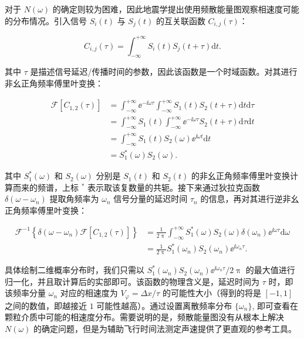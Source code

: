 对于 $N(\omega)$ 的确定则较为困难，因此地震学提出使用频散能量图观察相速度可能的分布情况。引入信号 $S_{i}(t)$ 与 $S_{j}(t)$ 的互关联函数 $C_{i,j}(\tau)$：

\begin{equation}
  C_{i,j}(\tau) = \int_{-\infty}^{+\infty}S_{i}(t)S_{j}(t+\tau)\mathrm{d}t.
\end{equation}

其中 $\tau$ 是描述信号延迟/传播时间的参数，因此该函数是一个时域函数。对其进行非幺正角频率傅里叶变换：

\begin{align}
  \mathcal{F}[C_{1,2}(\tau)] &= \int_{-\infty}^{+\infty}{\ee}^{-\ii\omega\tau}\int_{-\infty}^{+\infty}S_{1}(t)S_{2}(t+\tau)\mathrm{d}t\mathrm{d}\tau \nonumber \\
  &= \int_{-\infty}^{+\infty}S_{1}(t)\int_{-\infty}^{+\infty}{\ee}^{-\ii\omega\tau}S_{2}(t+\tau)\mathrm{d}\tau\mathrm{d}t \nonumber \\
  &= \int_{-\infty}^{+\infty}S_{1}(t)S_{2}(\omega){\ee}^{\ii\omega t}\mathrm{d}t \nonumber \\
  &= S_{1}^{*}(\omega)S_{2}(\omega).
\end{align}

其中 $S_{1}^{*}(\omega)$ 和 $S_{2}(\omega)$ 分别是 $S_{1}(t)$ 和 $S_{2}(t)$ 的非幺正角频率傅里叶变换计算而来的频谱，上标 $^{*}$ 表示取该复数量的共轭。接下来通过狄拉克函数 $\delta(\omega-\omega_{n})$ 提取角频率为 $\omega_{n}$ 信号分量的延迟时间 $\tau_{n}$ 的信息，再对其进行逆非幺正角频率傅里叶变换：

\begin{align}
  \mathcal{F}^{-1}\left\{\delta(\omega-\omega_{n})\mathcal{F}[C_{1,2}(\tau)]\right\} &= \frac{1}{2\uppi}\int_{-\infty}^{+\infty}S_{1}^{*}(\omega)S_{2}(\omega)\delta(\omega_{n}){\ee}^{\ii\omega\tau}\mathrm{d}\omega \nonumber \\
  &= \frac{1}{2\uppi}S_{1}^{*}(\omega_{n})S_{2}(\omega_{n}){\ee}^{\ii\omega_{n}\tau}.
\end{align}

具体绘制二维概率分布时，我们只需以 $S_{1}^{*}(\omega_{n})S_{2}(\omega_{n}){\ee}^{\ii\omega_{n}\tau}/2\uppi$ 的最大值进行归一化，并且取计算后的实部即可。该函数的物理含义是，延迟时间为 $\tau$ 时，即该频率分量 $\omega_{n}$ 对应的相速度为 $V_{\varphi} = \Delta x/\tau$ 的可能性大小（得到的将是 $[-1,1]$ 之间的数值，即越接近 $1$ 可能性越高）。通过设置离散频率分布 $\{\omega_{n}\}$, 即可查看在颗粒介质中可能的相速度分布。需要说明的是，频散能量图没有从根本上解决 $N(\omega)$ 的确定问题，但是为辅助飞行时间法测定声速提供了更直观的参考工具。

